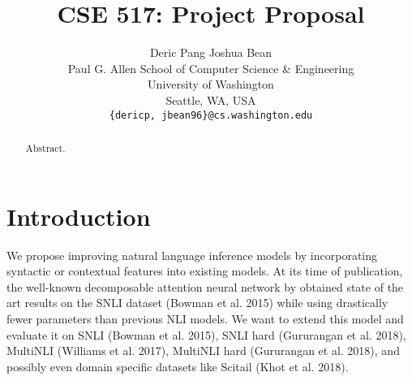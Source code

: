 \documentclass[11pt,a4paper]{article}
\title{CSE 517: Project Proposal}
\author{
  Deric Pang \quad
  Joshua Bean \\
  Paul G. Allen School of Computer Science \& Engineering \\
  University of Washington \\
  Seattle, WA, USA \\
  {\tt \{dericp, jbean96\}@cs.washington.edu} \\
}
\date{}
\begin{document}
\maketitle
\begin{abstract}
  Abstract.
\end{abstract}

\section{Introduction}

We propose improving natural language inference models by incorporating
syntactic or contextual features into existing models. At its time of
publication, the well-known decomposable attention neural network by
\citet{parikh2016decomposable} obtained state of the art results on the
SNLI dataset (Bowman et al.
2015) while using drastically fewer parameters than previous NLI models. We
want to extend this model and evaluate it on SNLI (Bowman et al. 2015), SNLI
hard (Gururangan et al. 2018), MultiNLI (Williams et al. 2017), MultiNLI hard
(Gururangan et al. 2018), and possibly even domain specific datasets like
Scitail (Khot et al. 2018).



\end{document}
